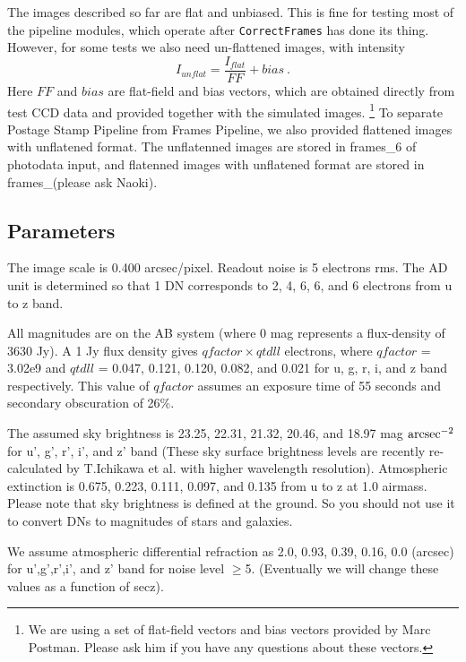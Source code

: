 The images described so far are flat and unbiased.  This is fine for
testing most of the pipeline modules, which operate after {\tt CorrectFrames}
has done its thing.  However, for some tests we also need un-flattened
images, with intensity
\begin{equation}
I_{unflat} = \frac{I_{flat}}{FF} + bias ~.
\end{equation}
Here $FF$ and $bias$ are flat-field and bias vectors, which are obtained
directly from test CCD data and provided together with the simulated images.
\footnote{We are using a set of flat-field vectors and bias vectors provided by
Marc Postman.  Please ask him if you have any questions about these vectors.}
To separate Postage Stamp Pipeline from Frames Pipeline, we also
provided flattened images with unflatened format.
The unflatenned images are stored in frames\_6 of photodata input, and
flatenned images with unflatened format are stored in frames\_(please ask Naoki).

\vspace{10pt}
\subsection{Parameters}
The image scale is 0.400 arcsec/pixel.
Readout noise is 5 electrons rms.
The AD unit is determined so that 1 DN corresponds to 2, 4, 6, 6, and
6 electrons from u to z band.

All magnitudes are on the AB system (where 0 mag represents a
flux-density of 3630 Jy).
A 1 Jy flux density gives $qfactor \times qtdll$ electrons, where 
$qfactor$ = 3.02e9 and $qtdll$ = 0.047, 0.121, 0.120, 0.082, and 0.021
for u, g, r, i, and z band respectively.  This value of $qfactor$
assumes an exposure time of 55 seconds and secondary obscuration of 26\%.

The assumed sky brightness is 23.25, 22.31, 21.32, 20.46, and 18.97 mag 
${\rm arcsec}^{-2}$ for u', g', r', i', and z' band (These sky surface
brightness levels are recently re-calculated by T.Ichikawa et al. with
higher wavelength resolution). 
Atmospheric extinction is 0.675, 0.223, 0.111, 0.097, and 0.135 from u to z 
at 1.0 airmass.
Please note that sky brightness is defined at the ground.
So you should not use it to convert DNs to magnitudes of stars and galaxies. 

We assume atmospheric differential refraction as 2.0, 0.93, 0.39, 0.16, 0.0 
(arcsec) for u',g',r',i', and z' band for noise level $\geq$5. 
(Eventually we will change these values as a function of secz).

